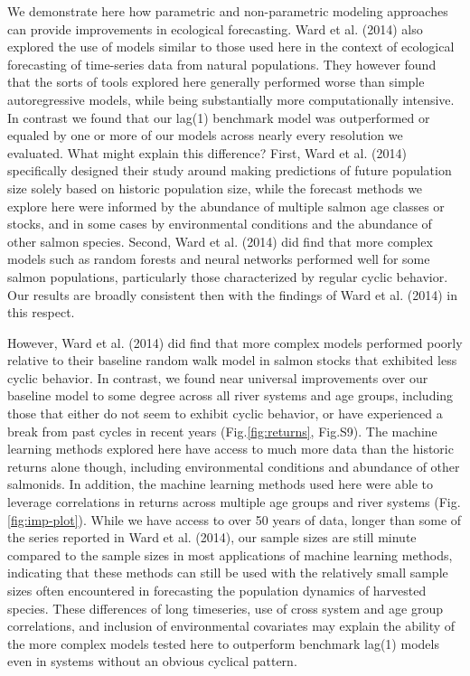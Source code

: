 \documentclass[
]{article}
\begin{document}
We demonstrate here how parametric and non-parametric modeling approaches can provide improvements in ecological forecasting. Ward et al. (2014) also explored the use of models similar to those used here in the context of ecological forecasting of time-series data from natural populations. They however found that the sorts of tools explored here generally performed worse than simple autoregressive models, while being substantially more computationally intensive. In contrast we found that our lag(1) benchmark model was outperformed or equaled by one or more of our models across nearly every resolution we evaluated. What might explain this difference? First, Ward et al. (2014) specifically designed their study around making predictions of future population size solely based on historic population size, while the forecast methods we explore here were informed by the abundance of multiple salmon age classes or stocks, and in some cases by environmental conditions and the abundance of other salmon species. Second, Ward et al. (2014) did find that more complex models such as random forests and neural networks performed well for some salmon populations, particularly those characterized by regular cyclic behavior. Our results are broadly consistent then with the findings of Ward et al. (2014) in this respect.

However, Ward et al. (2014) did find that more complex models performed poorly relative to their baseline random walk model in salmon stocks that exhibited less cyclic behavior. In contrast, we found near universal improvements over our baseline model to some degree across all river systems and age groups, including those that either do not seem to exhibit cyclic behavior, or have experienced a break from past cycles in recent years (Fig.\ref{fig:returns}, Fig.S9). The machine learning methods explored here have access to much more data than the historic returns alone though, including environmental conditions and abundance of other salmonids. In addition, the machine learning methods used here were able to leverage correlations in returns across multiple age groups and river systems (Fig.\ref{fig:imp-plot}). While we have access to over 50 years of data, longer than some of the series reported in Ward et al. (2014), our sample sizes are still minute compared to the sample sizes in most applications of machine learning methods, indicating that these methods can still be used with the relatively small sample sizes often encountered in forecasting the population dynamics of harvested species. These differences of long timeseries, use of cross system and age group correlations, and inclusion of environmental covariates may explain the ability of the more complex models tested here to outperform benchmark lag(1) models even in systems without an obvious cyclical pattern.
\end{document}
